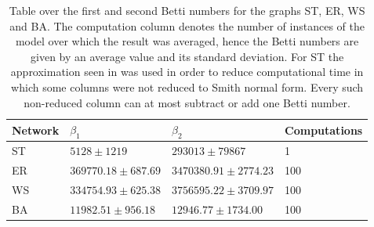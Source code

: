 \begin{table}[ht]
\centering
\begin{tabular}{*4l}    \toprule
  Network & $\beta_{1} $  & $\beta_{2}$  & Computations \\ \toprule
  ST &   $5128 \pm 1219$ & $293013 \pm 79867$ & 1 \\
  ER &  $369770.18 \pm 687.69$ & $3470380.91 \pm 2774.23$ & 100 \\
  WS & $334754.93 \pm 625.38$ & $3756595.22 \pm 3709.97$ & 100 \\
  BA &  $11982.51 \pm 956.18$ & $12946.77  \pm 1734.00$ & 100
  \midrule
  \\
  \bottomrule
\end{tabular}
\caption{\label{bettis} Table over the first and second Betti numbers for the graphs ST, ER, WS and BA. The computation column denotes the number of instances of the model over which the result was averaged, hence the Betti numbers are given by an average value and its standard deviation. For ST the approximation seen in \cite{luetdigraph} was used in order to reduce computational time in which some columns were not reduced to Smith normal form. Every such non-reduced column can at most subtract or add one Betti number.}
\end{table}


